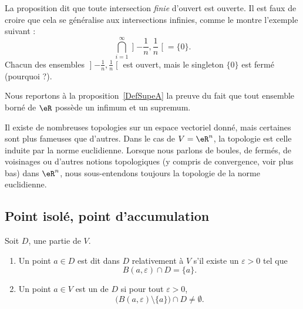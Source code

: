 La proposition dit que toute intersection \emph{finie} d'ouvert est ouverte. Il est faux de croire que cela se généralise aux intersections infinies, comme le montre l'exemple suivant :
\begin{equation}
	\bigcap_{i=1}^{\infty}\mathopen] -\frac{1}{ n } , \frac{1}{ n } \mathclose[=\{ 0 \}.
\end{equation}
Chacun des ensembles $\mathopen] -\frac{1}{ n } , \frac{1}{ n } \mathclose[$ est ouvert, mais le singleton $\{ 0 \}$ est fermé (pourquoi ?).

Nous reportons à la proposition~\ref{DefSupeA} la preuve du fait que tout ensemble borné de $\eR$ possède un infimum et un supremum.


Il existe de nombreuses topologies sur un espace vectoriel donné, mais certaines sont plus fameuses que d'autres. Dans le cas de $V=\eR^n$, la topologie  est celle induite par la norme euclidienne. Lorsque nous parlons de boules, de fermés, de voisinages ou d'autres notions topologiques (y compris de convergence, voir plus bas) dans $\eR^n$, nous sous-entendons toujours la topologie de la norme euclidienne.


\subsection{Point isolé, point d'accumulation}

\begin{definition}
	Soit $D$, une partie de $V$.
	\begin{enumerate}
		\item
			Un point $a\in D$ est dit  dans $D$ relativement à $V$ s'il existe un $\varepsilon>0$ tel que
			\begin{equation}
				B(a,\varepsilon)\cap D=\{ a \}.
			\end{equation}
		\item
			Un point $a\in V$ est un  de $D$ si pour tout $\varepsilon>0$,
			\begin{equation}
				\Big( B(a,\varepsilon)\setminus\{ a \}\Big)\cap D\neq \emptyset.
			\end{equation}
	\end{enumerate}
\end{definition}

